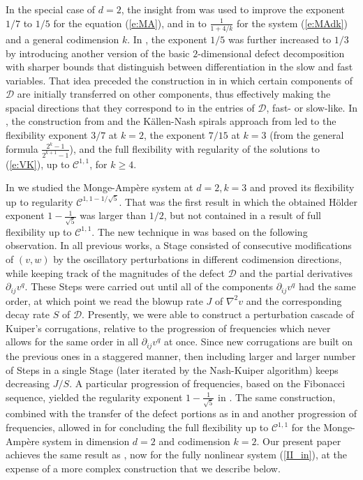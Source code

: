 \documentclass[reqno,twoside,11pt]{amsart}
\numberwithin{equation}{section}
\theoremstyle{plain}
\theoremstyle{definition}
\begin{document}
\medskip

In the special case of $d=2$, the insight from
\cite{DIS1/5} was used to improve the exponent $1/7$ to $1/5$ for the equation (\ref{e:MA}),
and in \cite{lew_improved} to $\frac{1}{1+4/k}$ for the system (\ref{e:MAdk}) and
a general codimension $k$. In \cite{CHI}, the exponent $1/5$ 
was further increased to $1/3$ by introducing
another version of the basic $2$-dimensional defect decomposition with
sharper bounds that distinguish between differentiation in the slow and fast variables. That
idea preceded the construction in \cite{CHI2} in
which certain components of $\mathcal{D}$ are initially transferred on other
components, thus effectively making the spacial directions that they
correspond to in the entries of $\mathcal{D}$, fast- or slow-like. In 
\cite{lew_improved2}, the construction from \cite{CHI} and the
K\"allen-Nash spirals approach from \cite{lew_conv} led to the 
flexibility exponent $3/7$ at $k=2$, the exponent $7/15$ at $k=3$
(from the general formula $\frac{2^{k}-1}{2^{k+1}-1}$),
and the full flexibility with regularity of the
solutions to (\ref{e:VK}), up to $\mathcal{C}^{1,1}$, for $k\geq 4$. 

\medskip

In \cite{in_lew} we studied the Monge-Amp\`ere system at $d=2, k=3$
and proved its flexibility up to regularity $\mathcal{C}^{1,1-1/\sqrt{5}}$. 
That was the first result in which the obtained
H\"older exponent $1-\frac{1}{\sqrt{5}}$ was larger than $1/2$,
but not contained in a result of full flexibility up to
$\mathcal{C}^{1,1}$. The new technique in \cite{in_lew} was based on the following
observation. In all previous works, a Stage consisted of consecutive
modifications of $(v, w)$ by the oscillatory perturbations in
different codimension directions, while keeping track
of the magnitudes of the defect $\mathcal{D}$ and the partial
derivatives $\partial_{ij}v^q$. These Steps were carried out until all
of the components $\partial_{ij}v^q$ had the same order,
at which point we read the blowup rate $J$ of $\nabla^2v$ and the
corresponding decay rate $S$ of $\mathcal{D}$. Presently, we were able
to construct a perturbation cascade of Kuiper's
corrugations, relative to the progression of frequencies which never
allows for the same order in all $\partial_{ij}v^q$ at once. Since new
corrugations are built on the previous ones in a staggered manner,
then including larger and larger number of Steps in a single Stage (later
iterated by the Nash-Kuiper algorithm) keeps decreasing $J/S$. A
particular progression of frequencies, based on the Fibonacci
sequence, yielded the regularity exponent $1-\frac{1}{\sqrt{5}}$ in
\cite{in_lew}. The same construction, combined with the transfer of
the defect portions as in \cite{CHI2} and another progression of
frequencies, allowed in \cite{in_lew2} for concluding the full
flexibility up to $\mathcal{C}^{1,1}$ for the
Monge-Amp\`ere system in dimension $d=2$ and codimension $k=2$.
Our present paper achieves the same result as \cite{in_lew2}, now for the fully nonlinear
system (\ref{II_in}), at the expense of a more complex
construction that we describe below. 
\end{document}
